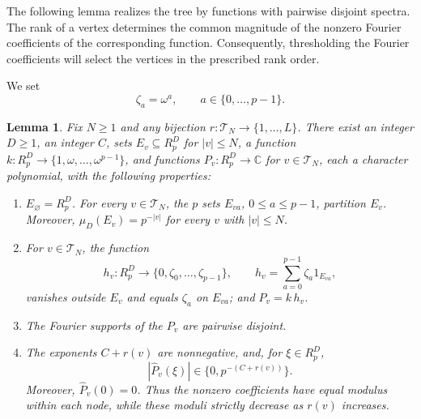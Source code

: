 \documentclass[11pt]{amsart}
\newtheorem{lemma}[theorem]{Lemma}
\theoremstyle{definition}
\theoremstyle{remark}
\newcommand{\R}{R}
\newcommand{\T}{\mathcal T}
\begin{document}
The following lemma realizes the tree by functions with pairwise
disjoint spectra. The rank of a vertex determines the common magnitude
of the nonzero Fourier coefficients of the corresponding function.
Consequently, thresholding the Fourier coefficients will select the
vertices in the prescribed rank order.

We set
\[
 \zeta_a=\omega^a,\qquad a\in\{0,\ldots,p-1\}.
\]

\begin{lemma}\label{lem:realize}
Fix \(N\geq1\) and any bijection \(r:\T_N\to\{1,\ldots,L\}\).
There exist an integer \(D\geq1\), an integer \(C\),
sets \(E_v\subseteq\R_p^D\) for \(|v|\leq N\), a function
\(k:\R_p^D\to\{1,\omega,\ldots,\omega^{p-1}\}\), and functions
\(P_v:\R_p^D\to\mathbb C\) for \(v\in\T_N\), each a character polynomial, with the following properties:
\begin{enumerate}
 \item \(E_\varnothing=\R_p^D\). For every \(v\in\T_N\), the \(p\) sets
       \(E_{va}\), \(0\leq a\leq p-1\), partition \(E_v\). Moreover,
       \(\mu_D(E_v)=p^{-|v|}\) for every \(v\) with \(|v|\leq N\).
 \item For \(v\in\T_N\), the function
       \[
        h_v:\R_p^D\to\{0,\zeta_0,\ldots,\zeta_{p-1}\},\qquad
        h_v=\sum_{a=0}^{p-1}\zeta_a1_{E_{va}},
       \]
       vanishes outside \(E_v\) and equals \(\zeta_a\) on \(E_{va}\);
       and \(P_v=k\,h_v\).
 \item The Fourier supports of the \(P_v\) are pairwise disjoint.
 \item The exponents \(C+r(v)\) are nonnegative, and, for
       \(\xi\in\R_p^D\),
       \[
        |\widehat P_v(\xi)|\in\{0,p^{-(C+r(v))}\}.
       \]
       Moreover, \(\widehat P_v(0)=0\).
       Thus the nonzero coefficients have equal modulus within each
       node, while these moduli strictly decrease as \(r(v)\) increases.
\end{enumerate}
\end{lemma}
\end{document}
